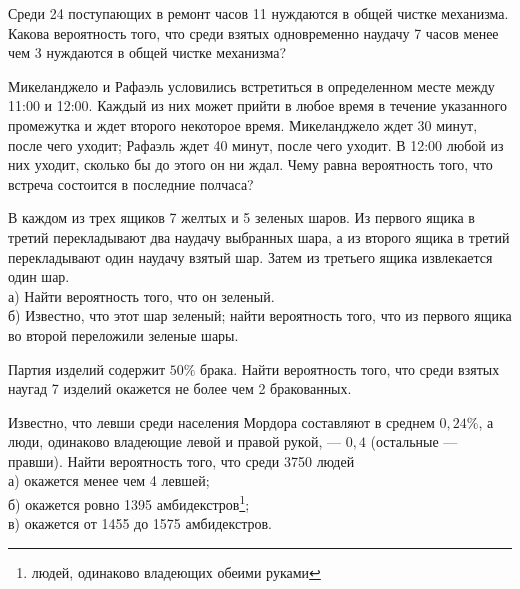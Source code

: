 \newpage\setcounter{zad}{0}



\begin{zkrW}{20}\noindent 
	Среди 24 поступающих в ремонт часов 11 нуждаются в общей чистке механизма. Какова вероятность того, что среди взятых одновременно наудачу 7 часов менее чем 3 нуждаются в общей чистке механизма?
 
\end{zkrW}

\begin{zkrW}{20}\noindent 
	Микеланджело и Рафаэль условились встретиться в определенном месте между 11:00 и 12:00. Каждый из них может прийти в любое время в течение указанного промежутка и ждет второго некоторое время. Микеланджело ждет 30 минут, после чего уходит; Рафаэль ждет 40 минут, после чего уходит. В 12:00 любой из них уходит, сколько бы до этого он ни ждал. Чему равна вероятность того, что встреча состоится в последние полчаса?
 
\end{zkrW}

\begin{zkrW}{20}\noindent 
	В каждом из трех ящиков 7 желтых и 5 зеленых шаров. Из первого ящика в третий перекладывают два наудачу выбранных шара, а из второго ящика в третий перекладывают один наудачу взятый шар. Затем из третьего ящика извлекается один шар. \\ \indent а) Найти вероятность того, что он зеленый. \\ \indent б) Известно, что этот шар зеленый; найти вероятность того, что из первого ящика во второй переложили зеленые шары.
 
\end{zkrW}

\begin{zkrW}{20}\noindent 
	Партия изделий содержит $50\%$ брака. Найти вероятность того, что среди взятых наугад 7 изделий окажется не более чем 2 бракованных.
 
\end{zkrW}

\begin{zkrW}{20}\noindent 
	Известно, что левши среди населения Мордора составляют в среднем $0{,}24\%$, а люди, одинаково владеющие левой и правой рукой, --- $0{,}4$ (остальные --- правши). Найти вероятность того, что среди 3750 людей \\ \indent а) окажется менее чем 4 левшей; \\ \indent б) окажется ровно 1395 амбидекстров\footnote{людей, одинаково владеющих обеими руками}; \\ \indent в) окажется от 1455 до 1575 амбидекстров.
 
\end{zkrW}


